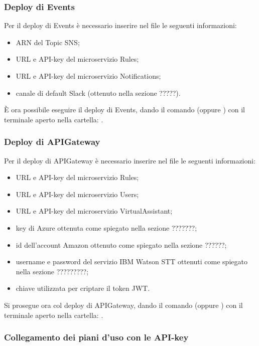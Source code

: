 \subsubsection{Deploy di Events}
Per il deploy di Events è necessario inserire nel file  le seguenti informazioni:
\begin{itemize}
	\item ARN del Topic SNS;
	\item URL e API-key del microservizio Rules;
	\item URL e API-key del microservizio Notifications;
	\item canale di default Slack (ottenuto nella sezione ?????).
\end{itemize}
È ora possibile eseguire il deploy di Events, dando il comando  (oppure ) con il terminale aperto nella cartella: .


\subsubsection{Deploy di APIGateway}
Per il deploy di APIGateway è necessario inserire nel file  le seguenti informazioni:
\begin{itemize}
	\item URL e API-key del microservizio Rules;
	\item URL e API-key del microservizio Users;
	\item URL e API-key del microservizio VirtualAssistant;
	\item key di Azure ottenuta come spiegato nella sezione ???????;
	\item id dell'account Amazon ottenuto come spiegato nella sezione ??????;
	\item username e password del servizio IBM Watson STT ottenuti come spiegato nella sezione ?????????;
	\item chiave utilizzata per criptare il token JWT.
\end{itemize}
Si prosegue ora col deploy di APIGateway, dando il comando  (oppure ) con il terminale aperto nella cartella: .

\subsubsection{Collegamento dei piani d'uso con le API-key}





\newpage

